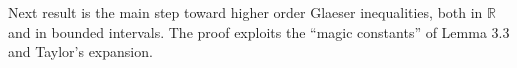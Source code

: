 \documentclass[11pt]{article}
\begin{document}
Next result is the main step toward higher order Glaeser inequalities, both in $\mathbb{R}$ and in
bounded intervals. The proof exploits the ``magic constants'' of Lemma 3.3 and Taylor's expansion.

\end{document}
